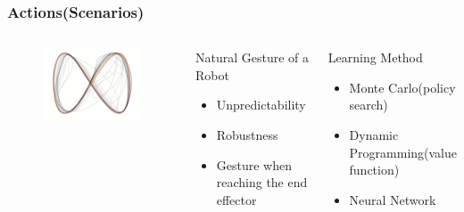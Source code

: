 \begin{frame}
  \frametitle{Actions(Scenarios)}

  \begin{columns}
    \begin{figure}[!ht]
      \centering
      \includegraphics[width=6cm]{scene.png}
    \end{figure}

    \begin{block}{Natural Gesture of a Robot}
      \begin{itemize}
      \item[] Unpredictability
      \item[] Robustness
      \item[] Gesture when reaching the end effector
      \end{itemize}
    \end{block}

    \begin{block}{Learning Method}
      \begin{itemize}
      \item[] Monte Carlo(policy search)
      \item[] Dynamic Programming(value function)
      \item[] Neural Network
      \end{itemize}
    \end{block}


  \end{columns}
\end{frame}

